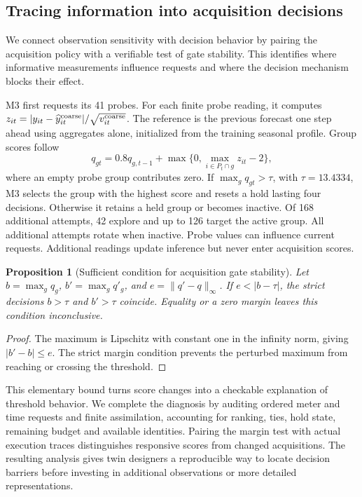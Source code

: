 \documentclass[conference]{IEEEtran}
\newtheorem{proposition}{Proposition}
\begin{document}
\subsection{Tracing information into acquisition decisions}
We connect observation sensitivity with decision behavior by pairing the acquisition policy with a verifiable test of gate stability. This identifies where informative measurements influence requests and where the decision mechanism blocks their effect.

M3 first requests its 41 probes. For each finite probe reading, it computes $z_{it}=|y_{it}-\widehat y^{\rm coarse}_{it}|/\sqrt{v^{\rm coarse}_{it}}$. The reference is the previous forecast one step ahead using aggregates alone, initialized from the training seasonal profile. Group scores follow
\begin{equation}
q_{gt}=0.8q_{g,t-1}+\max\{0,\max_{i\in P_t\cap g}z_{it}-2\},\label{eq:score}
\end{equation}
where an empty probe group contributes zero. If $\max_gq_{gt}>\tau$, with $\tau=13.4334$, M3 selects the group with the highest score and resets a hold lasting four decisions. Otherwise it retains a held group or becomes inactive. Of 168 additional attempts, 42 explore and up to 126 target the active group. All additional attempts rotate when inactive. Probe values can influence current requests. Additional readings update inference but never enter acquisition scores.

\begin{proposition}[Sufficient condition for acquisition gate stability]
Let $b=\max_gq_g$, $b'=\max_gq'_g$, and $e=\|q'-q\|_\infty$. If $e<|b-\tau|$, the strict decisions $b>\tau$ and $b'>\tau$ coincide. Equality or a zero margin leaves this condition inconclusive.
\end{proposition}
\begin{proof}
The maximum is Lipschitz with constant one in the infinity norm, giving $|b'-b|\le e$. The strict margin condition prevents the perturbed maximum from reaching or crossing the threshold.
\end{proof}

This elementary bound turns score changes into a checkable explanation of threshold behavior. We complete the diagnosis by auditing ordered meter and time requests and finite assimilation, accounting for ranking, ties, hold state, remaining budget and available identities. Pairing the margin test with actual execution traces distinguishes responsive scores from changed acquisitions. The resulting analysis gives twin designers a reproducible way to locate decision barriers before investing in additional observations or more detailed representations.
\end{document}
